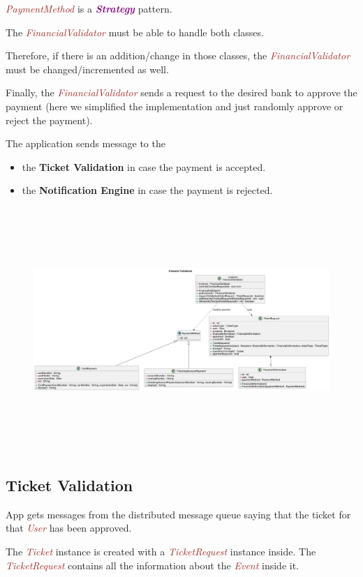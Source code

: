 \documentclass{article}
\newcommand{\designpattern}[1]{\textbf{\textit{\textcolor{purple}{#1}}}}
\newcommand{\designclass}[1]{\textit{\textcolor{brown}{#1}}}
\newcommand{\application}[1]{\textbf{\textcolor{codegreen}{#1}}}
\begin{document}
\designclass{PaymentMethod} is a \designpattern{Strategy} pattern.

The \designclass{FinancialValidator} must be able to handle both classes.

Therefore, if there is an addition/change in those classes, the \designclass{FinancialValidator} must be changed/incremented as well.

Finally, the \designclass{FinancialValidator} sends a request to the desired bank to approve the payment (here we simplified the implementation and just randomly approve or reject the payment).

The application sends message to the 
\begin{itemize}
    \item the \application{Ticket Validation} in case the payment is accepted.
    \item the \application{Notification Engine} in case the payment is rejected.
\end{itemize}

\begin{figure}[h]
    \centering
    \includegraphics[width=\textwidth, height=350px, keepaspectratio]{assets/uml/relations/FinancialValidation.png}
\end{figure}

\FloatBarrier
\subsection{Ticket Validation}
App gets messages from the distributed message queue saying that the ticket for that \designclass{User} has been approved.

The \designclass{Ticket} instance is created with a \designclass{TicketRequest} instance inside. The \designclass{TicketRequest} contains all the information about the \designclass{Event} inside it.
\end{document}
